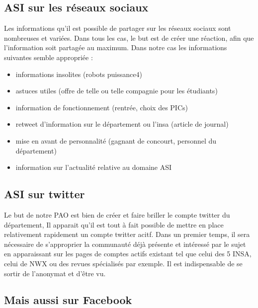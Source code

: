 \subsection{ASI sur les réseaux sociaux}
Les informations qu'il est possible de partager sur les réseaux sociaux sont nombreuses et variées. Dans tous les cas, le but est de créer une réaction, afin que l'information soit partagée au maximum. Dans notre cas les informations suivantes semble appropriée :
\begin{itemize}
	\item informations insolites (robots puissance4)
	\item astuces utiles (offre de telle ou telle compagnie pour les étudiants)
	\item information de fonctionnement (rentrée, choix des PICs)
	\item retweet d'information sur le département ou l'insa (article de journal)
	\item mise en avant de personnalité (gagnant de concourt, personnel du département)
	\item information sur l'actualité relative au domaine ASI
\end{itemize}

\subsection{ASI sur twitter}
Le but de notre PAO est bien de créer et faire briller le compte twitter du département, Il apparait qu'il est tout à fait possible de mettre en place relativement rapidement un compte twitter acitf.
Dans un premier temps, il sera nécessaire de s'approprier la communauté déjà présente et intéressé par le sujet en apparaissant sur les pages de comptes actifs existant tel que celui des 5 INSA, celui de NWX ou des revues spécialisés par exemple.
Il est indispensable de se sortir de l'anonymat et d'être vu.

\subsection{Mais aussi sur Facebook}